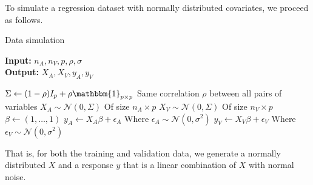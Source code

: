 To simulate a regression dataset with normally distributed covariates, we proceed as follows.

\begin{algorithm}[H]
	\caption{Data simulation}
	\hspace*{\algorithmicindent} \textbf{Input:} $n_A,n_V,p,\rho, \sigma$\\
	\hspace*{\algorithmicindent} \textbf{Output:} $X_A, X_V, y_A, y_V$  \\
	\begin{algorithmic}[1]
		\State $\Sigma \leftarrow (1-\rho) I_p + \rho \mathbbm{1}_{p\times p}$ \Comment Same correlation $\rho$ between all pairs of variables
		\State $X_A \sim \mathcal{N}(0,\Sigma)$ \Comment Of size $n_A \times p$
		\State $X_V \sim \mathcal{N}(0,\Sigma)$ \Comment Of size $n_V \times p$
		\State $\beta \leftarrow (1,\ldots,1)$
		\State $y_A \leftarrow X_A \beta + \epsilon_A$ \Comment Where $\epsilon_A \sim \mathcal{N}(0,\sigma^2)$
		\State $y_V \leftarrow X_V \beta + \epsilon_V$ \Comment Where $\epsilon_V \sim \mathcal{N}(0,\sigma^2)$
	\end{algorithmic}
\end{algorithm}

That is, for both the training and validation data, we generate a normally distributed $X$ and a response $y$ that is a linear combination of $X$ with normal noise.